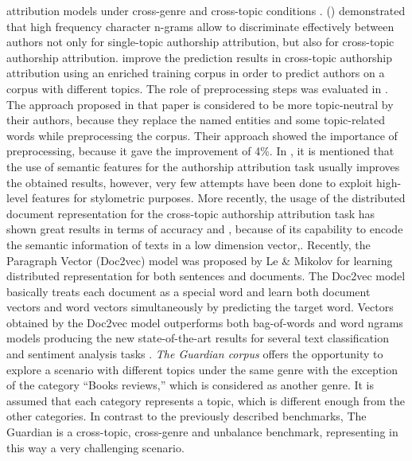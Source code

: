 attribution models under cross-genre and cross-topic conditions  \cite{gomez2018document}.
\citeauthor{stamatatos2013robustness} (\citeyear{stamatatos2013robustness}) demonstrated that high frequency character n-grams allow to discriminate effectively between authors
not only for single-topic authorship attribution, but also for cross-topic authorship attribution. \citeauthor{sapkota2014cross} \cite{sapkota2014cross} improve the prediction results in cross-topic authorship attribution using an enriched training corpus in order to predict authors on a corpus with different topics.
The role of preprocessing steps was evaluated in \cite{markov2017improving}. The approach proposed in
that paper is considered to be more topic-neutral by their authors, because they replace
the named entities and some topic-related words while preprocessing the corpus. Their
approach showed the importance of preprocessing, because it gave the improvement
of 4\%.
In \cite{stamatatos2013robustness}, it is mentioned that the use of semantic features for the authorship attribution task usually improves the obtained results, however, very few attempts have been done
to exploit high-level features for stylometric purposes. More recently, the
usage of the distributed document representation for the cross-topic authorship attribution task has shown great results in terms of accuracy \cite{posadas2017application} and \cite{gomez2018document}, because
of its capability to encode the semantic information of texts in a low dimension vector,.
Recently, the Paragraph Vector (Doc2vec) model was proposed by Le \&
Mikolov \cite{le2014distributed} for learning distributed representation for both sentences and documents. The Doc2vec model basically treats each document as a special word and learn
both document vectors and word vectors simultaneously by predicting the target word.
Vectors obtained by the Doc2vec model outperforms both bag-of-words and word ngrams models producing the new state-of-the-art results for several text classification and sentiment analysis tasks \cite{gomez2018document}.
\textit{The Guardian corpus} offers the opportunity to explore
a scenario with different topics under the same genre with
the exception of the category “Books reviews,” which is
considered as another genre. It is assumed that each category represents a topic, which is different enough from
the other categories. In contrast to the previously described
benchmarks, The Guardian is a cross-topic, cross-genre and
unbalance benchmark, representing in this way a very challenging scenario.

